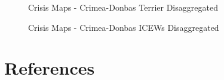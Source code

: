 \documentclass{article}
\begin{document}
\hphantom{em}
\begin{figure}
\caption{Crisis Maps - Crimea-Donbas Terrier Disaggregated \label{fig:p_terrier_plot_lv0_471}}
\end{figure}

\hphantom{em}
\begin{figure}
\caption{Crisis Maps - Crimea-Donbas ICEWs Disaggregated \label{fig:p_icews_plot_lv0_471}}
\end{figure}
\clearpage

\hypertarget{references}{%
\section{References}\label{references}}
\end{document}
